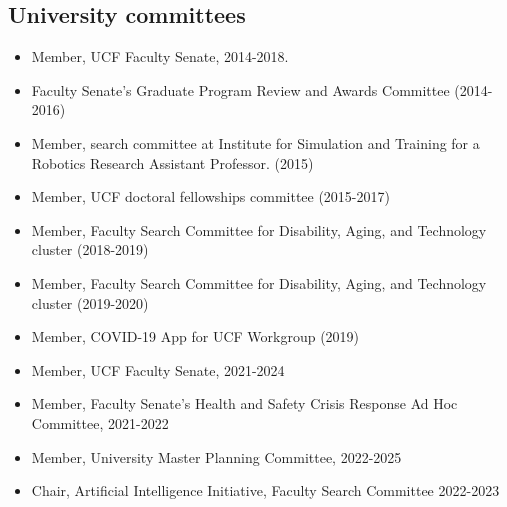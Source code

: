 \subsection*{University committees}

\begin{itemize}

\item Member, UCF Faculty Senate, 2014-2018.

\item Faculty Senate's Graduate Program Review and Awards Committee (2014-2016)

\item Member, search committee at Institute for Simulation and Training for a Robotics Research Assistant Professor. (2015)

\item Member, UCF doctoral fellowships committee (2015-2017)

\item Member, Faculty Search Committee for Disability, Aging, and Technology cluster (2018-2019)

\item Member, Faculty Search Committee for Disability, Aging, and Technology cluster (2019-2020)

\item Member, COVID-19 App for UCF Workgroup (2019)

\item Member, UCF Faculty Senate, 2021-2024

\item Member, Faculty Senate's Health and Safety Crisis Response Ad Hoc Committee, 2021-2022

\item Member, University Master Planning Committee, 2022-2025

\item Chair, Artificial Intelligence Initiative, Faculty Search Committee 2022-2023



\end{itemize}
